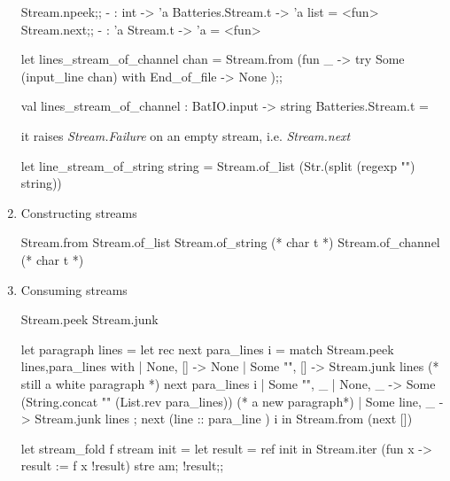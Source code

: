 \begin{enumerate}
\begin{alternate}
Stream.npeek;;
- : int -> 'a Batteries.Stream.t -> 'a list = <fun>
Stream.next;;
- : 'a Stream.t -> 'a = <fun>
\end{alternate}



\begin{redcode}
let lines_stream_of_channel chan = Stream.from (fun _ -> 
    try Some (input_line chan) with End_of_file -> None );;
\end{redcode}

\begin{bluecode}  
val lines_stream_of_channel : BatIO.input -> string Batteries.Stream.t =
\end{bluecode}


it raises \textit{Stream.Failure} on an empty stream,
i.e. \textit{Stream.next}

\begin{redcode}
let line_stream_of_string string =
  Stream.of_list (Str.(split (regexp "\n") string))
\end{redcode}

\item Constructing streams \\
  \begin{bluetext}
    Stream.from
    Stream.of_list
    Stream.of_string (* char t *)
    Stream.of_channel (* char t *)
  \end{bluetext}

\item Consuming streams \\

\begin{bluetext}
   Stream.peek
   Stream.junk
\end{bluetext}

\begin{bluecode}
let paragraph lines =
  let rec next para_lines i =
    match Stream.peek lines,para_lines with
    | None, [] -> None
    | Some "", [] ->
      Stream.junk lines (* still a white paragraph *)
      next para_lines i
    | Some "", _ | None, _ ->
      Some (String.concat "\n" (List.rev para_lines)) (* a new paragraph*)
    | Some line, _ ->
      Stream.junk lines ;
      next (line :: para_line ) i in
  Stream.from (next [])    
\end{bluecode}

\begin{redcode}
let stream_fold f stream init = 
    let result = ref init in 
    Stream.iter (fun x -> result := f x !result) stre  am; !result;;
  \end{redcode}


\end{enumerate}
